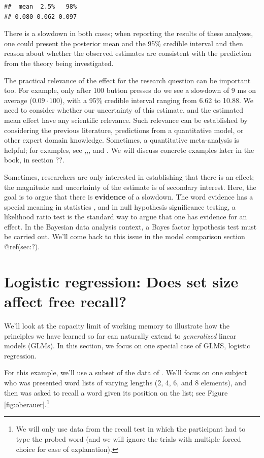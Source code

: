 \documentclass[12pt,]{krantz}
\theoremstyle{definition}
\theoremstyle{definition}
\theoremstyle{definition}
\theoremstyle{remark}
\begin{document}
\begin{verbatim}
##  mean  2.5%   98% 
## 0.080 0.062 0.097
\end{verbatim}

There is a slowdown in both cases; when reporting the results of these analyses, one could present the posterior mean and the 95\% credible interval and then reason about whether the observed estimates are consistent with the prediction from the theory being investigated.

The practical relevance of the effect for the research question can be important too. For example, only after 100 button presses do we see a slowdown of 9 ms on average (\(0.09 \cdot 100\)), with a 95\% credible interval ranging from 6.62 to 10.88. We need to consider whether our uncertainty of this estimate, and the estimated mean effect have any scientific relevance. Such relevance can be established by considering the previous literature, predictions from a quantitative model, or other expert domain knowledge. Sometimes, a quantitative meta-analysis is helpful; for examples, see \citet{JaegerEngelmannVasishth2017},\citet{mahowald2016meta},\citet{NicenboimRoettgeretal}, and \citet{vasishthProcessingChineseRelative2013}. We will discuss concrete examples later in the book, in section ??.

Sometimes, researchers are only interested in establishing that there is an effect; the magnitude and uncertainty of the estimate is of secondary interest. Here, the goal is to argue that there is \textbf{evidence} of a slowdown. The word evidence has a special meaning in statistics \citep{Royall}, and in null hypothesis significance testing, a likelihood ratio test is the standard way to argue that one has evidence for an effect. In the Bayesian data analysis context, a Bayes factor hypothesis test must be carried out. We'll come back to this issue in the model comparison section @ref(sec:?).

\hypertarget{sec:logistic}{%
\section{Logistic regression: Does set size affect free recall?}\label{sec:logistic}}

We'll look at the capacity limit of working memory to illustrate how the principles we have learned so far can naturally extend to \emph{generalized} linear models (GLMs). In this section, we focus on one special case of GLMS, logistic regression.

For this example, we'll use a subset of the data of \citet{oberauerWorkingMemoryCapacity2019}. We'll focus on one subject who was presented word lists of varying lengths (2, 4, 6, and 8 elements), and then was asked to recall a word given its position on the list; see Figure \ref{fig:oberauer}.\footnote{We will only use data from the recall test in which the participant had to type the probed word (and we will ignore the trials with multiple forced choice for ease of explanation).}
\end{document}
